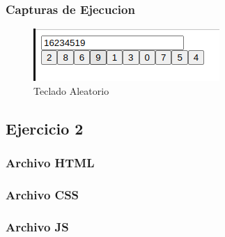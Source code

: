 \documentclass{article}
\begin{document}
	\subsubsection{Capturas de Ejecucion}
	\begin{figure}[H]
	    \centering
	    \includegraphics[scale=1]{img/exe/teclado-aleatorio.png}
	    \caption{Teclado Aleatorio}
	\end{figure}

\subsection{Ejercicio 2}
	\subsubsection{Archivo HTML}
	
	\subsubsection{Archivo CSS}
	

	\subsubsection{Archivo JS}
	
\end{document}
